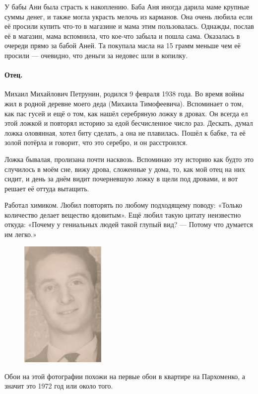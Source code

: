 \documentclass{book}
\begin{document}
У бабы Ани была страсть к накоплению.
Баба Аня иногда дарила маме крупные суммы денег, и также могла украсть мелочь из карманов.
Она очень любила если её просили купить что-то в магазине и мама этим пользовалась.
Однажды, послав её в магазин, мама вспомнила, что кое-что забыла и пошла сама.
Оказалась в очереди прямо за бабой Аней.
Та покупала масла на 15 грамм меньше чем её просили — очевидно, что деньги за недовес шли в копилку.

\paragraph{Отец.}  Михаил Михайлович Петрунин, родился 9 февраля 1938 года.
Во время войны жил в родной деревне моего деда (Михаила Тимофеевича).
Вспоминает о том, как пас гусей и ещё о том, как нашёл серебряную ложку в дровах.
Он всегда ел этой ложкой и повторял историю за едой бесчисленное число раз.
Дескать, думал ложка оловянная, хотел биту сделать, а она не плавилась.
Пошёл к бабке, та её золой потёрла и говорит, что это серебро, и он расстроился.

Ложка бывалая, пролизана почти насквозь.
Вспоминаю эту историю как будто это случилось в моём сне, вижу дрова, сложенные у дома, то, как мой отец на них сидит, и день за днём видит почерневшую ложку в щели под дровами, и вот решает её оттуда вытащить.

Работал химиком.
Любил повторять по любому подходящему поводу: «Только количество делает вещество ядовитым».
Ещё любил такую цитату неизвестно откуда:
«Почему у гениальных людей такой глупый вид? --- Потому что думается им легко.»

\begin{figure}
\vskip-4mm
\centering
\includegraphics[width=41mm,angle=0]{pics/papa}
\end{figure}

Обои на этой фотографии похожи на первые обои в квартире на Пархоменко, а значит это 1972 год или около того.
\end{document}
